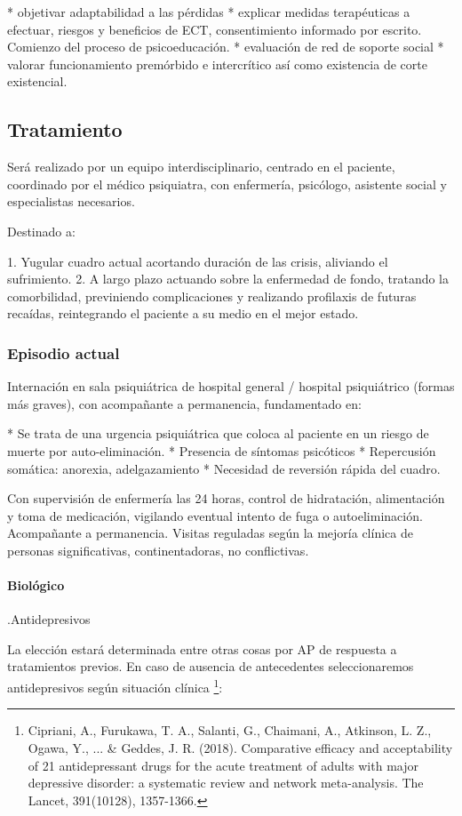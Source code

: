 * objetivar adaptabilidad a las pérdidas
* explicar medidas terapéuticas a efectuar, riesgos y beneficios de ECT, consentimiento informado por escrito. Comienzo del proceso de psicoeducación.
* evaluación de red de soporte social
* valorar funcionamiento premórbido e intercrítico así como existencia de corte existencial.
\subsection*{Tratamiento}
Será realizado por un equipo interdisciplinario, centrado en el paciente, coordinado por el médico psiquiatra, con enfermería, psicólogo, asistente social y especialistas necesarios.

Destinado a:

1. Yugular cuadro actual acortando duración de las crisis, aliviando el sufrimiento.
2. A largo plazo actuando sobre la enfermedad de fondo, tratando la comorbilidad, previniendo complicaciones y realizando profilaxis de futuras recaídas, reintegrando el paciente a su medio en el mejor estado.
\subsubsection*{Episodio actual}
Internación en sala psiquiátrica de hospital general / hospital psiquiátrico (formas más graves), con acompañante a permanencia, fundamentado en:

* Se trata de una urgencia psiquiátrica que coloca al paciente en un riesgo de muerte por auto-eliminación.
* Presencia de síntomas psicóticos
* Repercusión somática: anorexia, adelgazamiento
* Necesidad de reversión rápida del cuadro.

Con supervisión de enfermería las 24 horas, control de hidratación, alimentación y toma de medicación, vigilando eventual intento de fuga o autoeliminación. Acompañante a permanencia. Visitas reguladas según la mejoría clínica de personas significativas, continentadoras, no conflictivas.
\paragraph{Biológico}

.Antidepresivos

La elección estará determinada entre otras cosas por AP de respuesta a tratamientos previos. En caso de ausencia de antecedentes seleccionaremos antidepresivos según situación clínica \footnote{Cipriani, A., Furukawa, T. A., Salanti, G., Chaimani, A., Atkinson, L. Z., Ogawa, Y., ... \& Geddes, J. R. (2018). Comparative efficacy and acceptability of 21 antidepressant drugs for the acute treatment of adults with major depressive disorder: a systematic review and network meta-analysis. The Lancet, 391(10128), 1357-1366.}:


